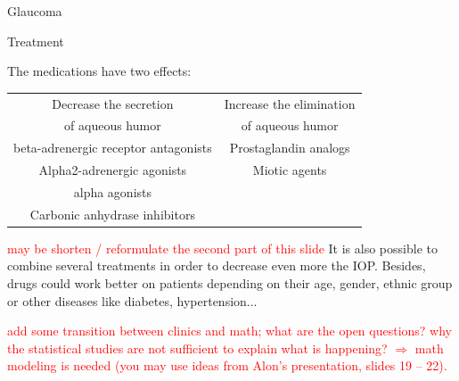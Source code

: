 \begin{frame}{Glaucoma}
{\begin{center}
\end{center}}
\end{frame}

\begin{frame}[shrink=5]{Treatment}

The medications have two effects:
\newline
\\
\begin{tabular}{|c|c|}
\hline
Decrease the secretion & Increase the elimination \\
of aqueous humor &  of aqueous humor\\
\hline
beta-adrenergic receptor antagonists & Prostaglandin analogs \\
Alpha2-adrenergic agonists & Miotic agents \\
alpha agonists &  \\
Carbonic anhydrase inhibitors &  \\
\hline
\end{tabular}
\newline
\newline

\textcolor{red}{may be shorten / reformulate the second part of this slide}
It is also possible to combine several treatments in order to decrease even more the IOP.
Besides, drugs could work better on patients depending on their age, gender, ethnic group or other diseases like diabetes, hypertension...

\end{frame}

\begin{frame}

\textcolor{red}{add some transition between clinics and math; what are the open questions?
why the statistical studies are not sufficient to explain what is happening? $\Rightarrow$ math modeling
is needed (you may use ideas from Alon's presentation, slides 19 -- 22).}
\end{frame}


